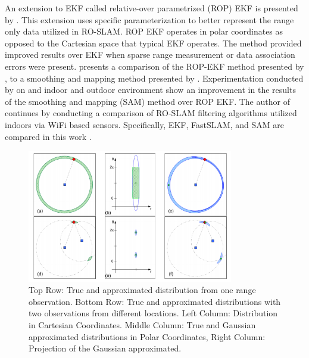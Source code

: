 \documentclass[conference]{IEEEtran}
\begin{document}
	
	
	
	
	
	
	
	
	An extension to EKF called relative-over parametrized (ROP) EKF is presented by \cite{Djugash2008}. This extension uses specific parameterization to  better represent the range only data utilized in RO-SLAM. ROP EKF operates in polar coordinates as opposed to the Cartesian space that typical EKF operates. The method provided improved results over EKF when sparse range measurement or data association errors were present. \cite{Herranz2014} presents a comparison of the ROP-EKF method presented by \cite{Djugash2008}, to a smoothing and mapping method presented by \cite{Dellaert2006}. Experimentation conducted by \cite{Herranz2014} on and indoor and outdoor environment show an improvement in the results of the smoothing and mapping (SAM) method over ROP EKF. The author of \cite{Herranz2014} continues by conducting a comparison of RO-SLAM filtering algorithms utilized indoors via WiFi based sensors. Specifically, EKF, FastSLAM, and SAM are compared in this work \cite{Herranz2016}.
	
	\begin{figure}[h!]
		
		\centering
		
		\includegraphics[width=90mm]{ROP_djugash.png}
		
		\caption{Top Row: True and approximated distribution from one range observation. Bottom Row: True and approximated distributions with two observations from different locations. Left Column: Distribution in Cartesian Coordinates. Middle Column: True and Gaussian approximated distributions in Polar Coordinates, Right Column: Projection of the Gaussian approximated. \cite{Djugash2008}} 
		
		\label{ROP_djugash}
		
	\end{figure}
	
\end{document}
